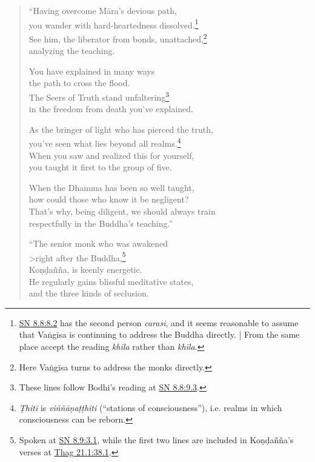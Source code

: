 \documentclass[12pt,openany]{book}%
\begin{document}
\begin{verse}
“Having overcome \textsanskrit{Māra}’s devious path, \\
you wander with hard-heartedness dissolved.\footnote{\href{https://suttacentral.net/sn8.8/en/sujato\#8.2}{SN 8.8:8.2} has the second person \textit{carasi}, and it seems reasonable to assume that \textsanskrit{Vaṅgīsa} is continuing to address the Buddha directly. | From the same place accept the reading \textit{khila} rather than \textit{\textsanskrit{khīla}}. } \\
See him, the liberator from bonds, unattached,\footnote{Here \textsanskrit{Vaṅgīsa} turns to address the monks directly. } \\
analyzing the teaching. 

You have explained in many ways \\
the path to cross the flood. \\
The Seers of Truth stand unfaltering\footnote{These lines follow Bodhi’s reading at \href{https://suttacentral.net/sn8.8/en/sujato\#9.3}{SN 8.8:9.3}. } \\
in the freedom from death you’ve explained. 

As the bringer of light who has pierced the truth, \\
you’ve seen what lies beyond all realms.\footnote{\textit{Ṭhiti} is \textit{\textsanskrit{viññāṇaṭṭhiti}} (“stations of consciousness”), i.e. realms in which consciousness can be reborn. } \\
When you saw and realized this for yourself, \\
you taught it first to the group of five. 

When the Dhamma has been so well taught, \\
how could those who know it be negligent? \\
That’s why, being diligent, we should always train \\
respectfully in the Buddha’s teaching.” 

“The senior monk who was awakened \\>right after the Buddha,\footnote{Spoken at \href{https://suttacentral.net/sn8.9/en/sujato\#3.1}{SN 8.9:3.1}, while the first two lines are included in \textsanskrit{Koṇḍañña}’s verses at \href{https://suttacentral.net/thag21.1/en/sujato\#38.1}{Thag 21.1:38.1}. } \\
\textsanskrit{Koṇḍañña}, is keenly energetic. \\
He regularly gains blissful meditative states, \\
and the three kinds of seclusion. 


\end{verse}
\end{document}
